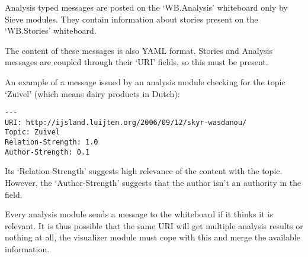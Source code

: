 Analysis typed messages are posted on the `WB.Analysis' whiteboard only by
Sieve modules. They contain information about stories present on the
`WB.Stories' whiteboard.

The content of these messages is also YAML format. Stories and Analysis
messages are coupled through their `URI' fields, so this must be present.

An example of a message issued by an analysis module checking for the topic
`Zuivel' (which means dairy products in Dutch):

\begin{verbatim}
---
URI: http://ijsland.luijten.org/2006/09/12/skyr-wasdanou/
Topic: Zuivel
Relation-Strength: 1.0
Author-Strength: 0.1
\end{verbatim}

Its `Relation-Strength' suggests high relevance of the content with the topic.
However, the `Author-Strength' suggests that the author isn't an authority in
the field.

Every analysis module sends a message to the whiteboard if it thinks it is
relevant. It is thus possible that the same URI will get multiple analysis
results or nothing at all, the visualizer module must cope with this and merge
the available information.


